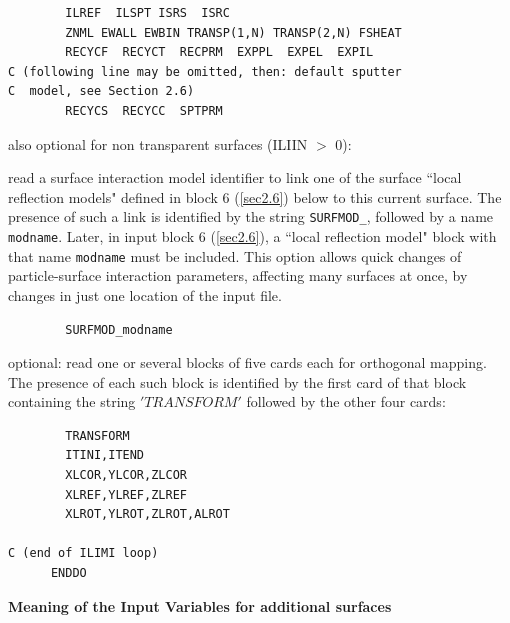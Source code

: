 \begin{lstlisting}
        ILREF  ILSPT ISRS  ISRC
        ZNML EWALL EWBIN TRANSP(1,N) TRANSP(2,N) FSHEAT
        RECYCF  RECYCT  RECPRM  EXPPL  EXPEL  EXPIL
C (following line may be omitted, then: default sputter 
C  model, see Section 2.6)
        RECYCS  RECYCC  SPTPRM
\end{lstlisting}

also optional for non transparent surfaces (ILIIN $>$ 0):

read a surface interaction model identifier to link one of the surface
``local reflection
models" defined in block 6 (\cref{sec2.6}) below to this current surface.
The presence of such a link is identified by the string \lstinline|SURFMOD_|,
followed by a name \lstinline|modname|.
Later, in input block 6 (\cref{sec2.6}), a ``local reflection model" block with
that name \lstinline|modname| must be included.
This option allows quick changes of particle-surface interaction parameters,
affecting many surfaces at once, by changes in just one location of the input
file.

\begin{lstlisting}
        SURFMOD_modname
\end{lstlisting}

optional: read one or several blocks of five cards each for orthogonal
mapping.
The presence of each such block is identified by the first card of that block
containing the string $'TRANSFORM'$ followed by the other four cards:

\begin{lstlisting}
        TRANSFORM
        ITINI,ITEND
        XLCOR,YLCOR,ZLCOR
        XLREF,YLREF,ZLREF
        XLROT,YLROT,ZLROT,ALROT

C (end of ILIMI loop)
      ENDDO
\end{lstlisting}

\medskip

\textbf{Meaning of the Input Variables for additional surfaces}

\medskip 

